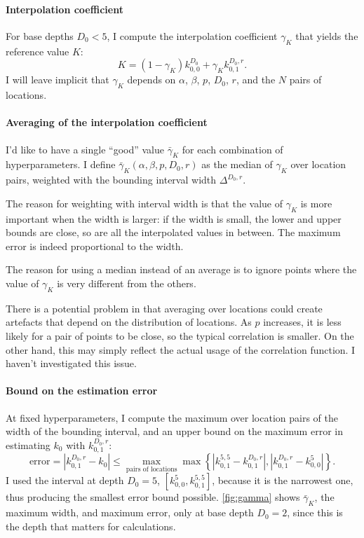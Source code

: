 \documentclass[a4paper]{article}
\theoremstyle{definition}
\begin{document}
    \paragraph{Interpolation coefficient}

    For base depths $D_0 < 5$, I compute the interpolation coefficient $\gamma_K$ that yields the reference value $K$:
    \begin{equation}
        K = (1 - \gamma_K) k^{D_0}_{0,0} + \gamma_K k^{D_0,r}_{0,1}.
    \end{equation}
    I will leave implicit that $\gamma_K$ depends on $\alpha$, $\beta$, $p$, $D_0$, $r$, and the $N$ pairs of locations.

    \paragraph{Averaging of the interpolation coefficient}

    I'd like to have a single ``good'' value $\bar\gamma_K$ for each combination of hyperparameters. I define $\bar\gamma_K(\alpha,\beta,p,D_0,r)$ as the median of $\gamma_K$ over location pairs, weighted with the bounding interval width $\Delta^{D_0,r}$.

    The reason for weighting with interval width is that the value of $\gamma_K$ is more important when the width is larger: if the width is small, the lower and upper bounds are close, so are all the interpolated values in between. The maximum error is indeed proportional to the width.

    The reason for using a median instead of an average is to ignore points where the value of $\gamma_K$ is very different from the others.

    There is a potential problem in that averaging over locations could create artefacts that depend on the distribution of locations. As $p$ increases, it is less likely for a pair of points to be close, so the typical correlation is smaller. On the other hand, this may simply reflect the actual usage of the correlation function. I haven't investigated this issue.

    \paragraph{Bound on the estimation error}

    At fixed hyperparameters, I compute the maximum over location pairs of the width of the bounding interval, and an upper bound on the maximum error in estimating $k_0$ with $k^{D_0,r}_{0,1}$:
    \begin{equation}
        \text{error} = |k^{D_0,r}_{0,1} - k_0| \le \max_\text{pairs of locations}\max \left\{
            |k^{5,5}_{0,1} - k^{D_0,r}_{0,1}|,
            |k^{D_0,r}_{0,1} - k^{5}_{0,0}|
        \right\}.
    \end{equation}
    I used the interval at depth $D_0=5$, $[k^5_{0,0}, k^{5,5}_{0,1}]$, because it is the narrowest one, thus producing the smallest error bound possible. \autoref{fig:gamma} shows $\bar\gamma_K$, the maximum width, and maximum error, only at base depth $D_0=2$, since this is the depth that matters for calculations.
    
\end{document}
